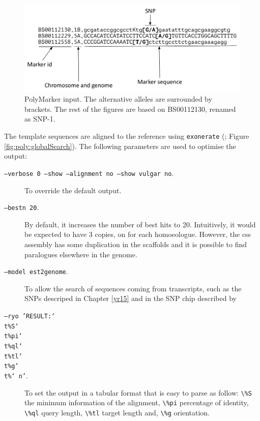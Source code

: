 \begin{figure}
    \includegraphics[width=1\textwidth]{PolyMarker/Figures/aln/input.pdf} 
      \caption[PolyMarker input]{PolyMarker input. The alternative alleles are surrounded by brackets. The rest of the figures are based on BS00112130, renamed as SNP-1.}
    \label{fig:poly:input}
\end{figure}

The template sequences are aligned to the reference using \verb|exonerate| (\citealt{Slater2005}; Figure \ref{fig:poly:globalSearch}). 
The following parameters are used to optimise the output:

\begin{description}

\item[\texttt{--verbose 0 --show --alignment no --show vulgar no}.] To override the default output. 
\item[\texttt{--bestn 20}.] By default, it increases the number of best hits to 20. Intuitively, it would be expected to have 3 copies, on for each homoeologue. However, the \acrshort{css} assembly has some duplication in the scaffolds and it is possible to find paralogues elsewhere in the genome. 
\item[\texttt{--model est2genome}.] To allow the search of sequences coming from transcripts, such as the SNPs descriped in Chapter \ref{yr15}  and in the SNP chip described by \citep{Allen2011}
\item[\texttt{--ryo 'RESULT:\char`\\t\%S\char`\\t\%pi\char`\\t\%ql\char`\\t\%tl\char`\\t\%g\char`\\t\%\char`\\n'}.]To set the output in a tabular format that is easy to parse as follow: \verb|\%S| the minimum information of the alignment, \verb|\%pi| percentage of identity, \verb|\%ql| query length, \verb|\%tl| target length and, \verb|\%g| orientation. 
\end{description}



